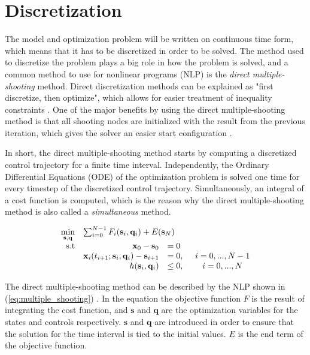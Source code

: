 \section{Discretization}

The model and optimization problem will be written on continuous time form, which means that it has to be discretized in order to be solved. The method used to discretize the problem plays a big role in how the problem is solved, and a common method to use for nonlinear programs (NLP) is the \textit{direct multiple-shooting} method. Direct discretization methods can be explained as "first discretize, then optimize", which allows for easier treatment of inequality constraints \cite{discDIEHL}. One of the major benefits by using the direct multiple-shooting method is that all shooting nodes are initialized with the result from the previous iteration, which gives the solver an easier start configuration \cite{stallMATHISEN}.

In short, the direct multiple-shooting method starts by computing a discretized control trajectory for a finite time interval. Independently, the Ordinary Differential Equations (ODE) of the optimization problem is solved one time for every timestep of the discretized control trajectory. Simultaneously, an integral of a cost function is computed, which is the reason why the direct multiple-shooting method is also called a \textit{simultaneous} method. 

\begin{equation}
\label{eq:multiple_shooting}
	\begin{array}{rrlcl}
	\displaystyle \min_{\mathbf{s},\mathbf{q}} & \multicolumn{3}{l}{\sum_{i=0}^{N-1} F_i(\mathbf{s}_i, \mathbf{q}_i)+ E(\mathbf{s}_N)} \\
	\textrm{s.t}
	& \mathbf{x}_0 - \mathbf{s}_0 & = 0 & \\
	& \mathbf{x}_i(t_{i+1};\mathbf{s}_i,\mathbf{q}_i)-\mathbf{s}_{i+1} & = 0,& \hspace{5pt} i = 0,...,N-1 \\
	& h(\mathbf{s}_i, \mathbf{q}_i) & \leq 0,& \hspace{5pt} i = 0,...,N
	\end{array}
\end{equation}

The direct multiple-shooting method can be described by the NLP shown in (\ref{eq:multiple_shooting}) \cite{stallMATHISEN}. In the equation the objective function $F$ is the result of integrating the cost function, and $\mathbf{s}$ and $\mathbf{q}$ are the optimization variables for the states and controls respectively. $\mathbf{s}$ and $\mathbf{q}$ are introduced in order to ensure that the solution for the time interval is tied to the initial values. $E$ is the end term of the objective function.